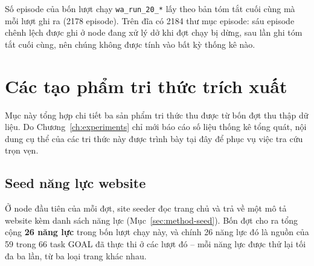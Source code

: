 Số episode của bốn lượt chạy \texttt{wa\_run\_20\_*} lấy theo bản tóm tắt
cuối cùng mà mỗi lượt ghi ra (2178 episode). Trên đĩa có 2184 thư mục episode: sáu episode chênh
lệch được ghi ở node đang xử lý dở khi đợt chạy bị dừng, sau lần ghi tóm tắt
cuối cùng, nên chúng không được tính vào bất kỳ thống kê nào.

\section{Các tạo phẩm tri thức trích xuất}
\label{app:runs-knowledge}

Mục này tổng hợp chi tiết ba sản phẩm tri thức thu được từ bốn đợt thu
thập dữ liệu. Do Chương~\ref{ch:experiments} chỉ mới báo cáo số liệu thống kê
tổng quát, nội dung cụ thể của các tri thức này được trình bày tại đây để phục
vụ việc tra cứu trọn vẹn.

\subsection*{Seed năng lực website}

Ở node đầu tiên của mỗi đợt, site seeder đọc trang chủ và trả về một mô tả
website kèm danh sách năng lực (Mục~\ref{sec:method-seed}). Bốn đợt cho ra
tổng cộng \textbf{26 năng lực} trong bốn lượt chạy này, và chính 26 năng lực đó là nguồn của 59 trong
66 task GOAL đã thực thi ở các lượt đó -- mỗi năng lực được thử lại tối đa ba lần, từ ba
loại trang khác nhau.


